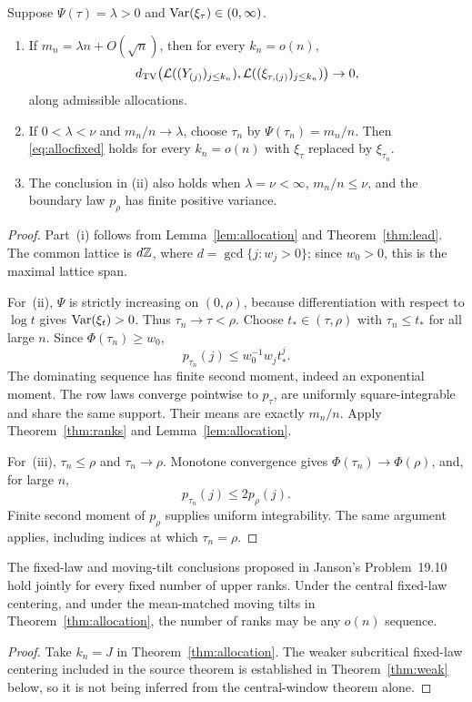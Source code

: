 \begin{theorem}\label{thm:allocation}
Suppose $\Psi(\tau)=\lambda>0$ and $\operatorname{Var}(\xi_\tau)\in(0,\infty)$.
\begin{enumerate}
 \item If $m_n=\lambda n+O(\sqrt n)$, then for every $k_n=o(n)$,
 \begin{equation}\label{eq:allocfixed}
 d_{\mathrm{TV}}\bigl(\mathcal L((Y_{(j)})_{j\le k_n}),
           \mathcal L((\xi_{\tau,(j)})_{j\le k_n})\bigr)\to0,
 \end{equation}
 along admissible allocations.
 \item If $0<\lambda<\nu$ and $m_n/n\to\lambda$, choose $\tau_n$ by $\Psi(\tau_n)=m_n/n$. Then \eqref{eq:allocfixed} holds for every $k_n=o(n)$ with $\xi_\tau$ replaced by $\xi_{\tau_n}$.
 \item The conclusion in \textnormal{(ii)} also holds when $\lambda=\nu<\infty$, $m_n/n\le\nu$, and the boundary law $p_\rho$ has finite positive variance.
\end{enumerate}
\end{theorem}
\begin{proof}
Part~(i) follows from Lemma~\ref{lem:allocation} and Theorem~\ref{thm:lead}. The common lattice is $d\mathbb Z$, where $d=\gcd\{j:w_j>0\}$; since $w_0>0$, this is the maximal lattice span.

For~(ii), $\Psi$ is strictly increasing on $(0,\rho)$, because differentiation with respect to $\log t$ gives $\operatorname{Var}(\xi_t)>0$. Thus $\tau_n\to\tau<\rho$. Choose $t_*\in(\tau,\rho)$ with $\tau_n\le t_*$ for all large $n$. Since $\Phi(\tau_n)\ge w_0$,
\[
 p_{\tau_n}(j)\le w_0^{-1}w_jt_*^j.
\]
The dominating sequence has finite second moment, indeed an exponential moment. The row laws converge pointwise to $p_\tau$, are uniformly square-integrable and share the same support. Their means are exactly $m_n/n$. Apply Theorem~\ref{thm:ranks} and Lemma~\ref{lem:allocation}.

For~(iii), $\tau_n\le\rho$ and $\tau_n\to\rho$. Monotone convergence gives $\Phi(\tau_n)\to\Phi(\rho)$, and, for large $n$,
\[
 p_{\tau_n}(j)\le 2p_\rho(j).
\]
Finite second moment of $p_\rho$ supplies uniform integrability. The same argument applies, including indices at which $\tau_n=\rho$.
\end{proof}

\begin{corollary}\label{cor:janson}
The fixed-law and moving-tilt conclusions proposed in Janson's Problem~19.10 hold jointly for every fixed number of upper ranks. Under the central fixed-law centering, and under the mean-matched moving tilts in Theorem~\ref{thm:allocation}, the number of ranks may be any $o(n)$ sequence.
\end{corollary}
\begin{proof}
Take $k_n=J$ in Theorem~\ref{thm:allocation}. The weaker subcritical fixed-law centering included in the source theorem is established in Theorem~\ref{thm:weak} below, so it is not being inferred from the central-window theorem alone.
\end{proof}


